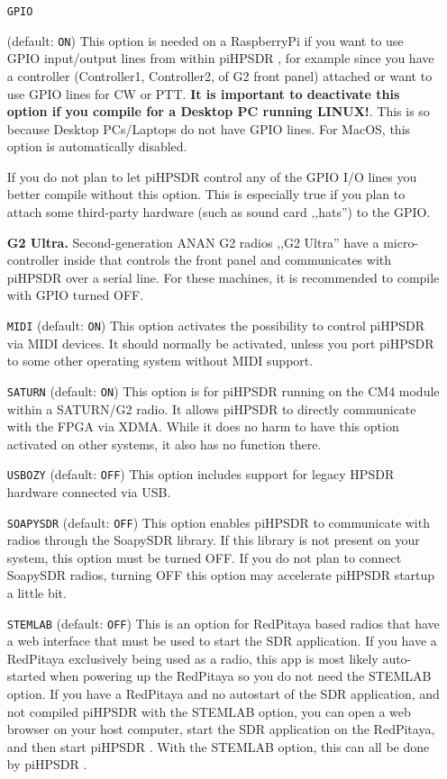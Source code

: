 \documentclass[12pt]{book}
\def\rett#1{\texttt{\color{red}#1}}
\def\pH{pi\-HPSDR }
\begin{document}
\begin{itemize}
\item[\rett{GPIO}] {(default: \texttt{ON})
This option is needed on a RaspberryPi if you want to use GPIO input/output lines from
within \pH, for example since you have a controller (Controller1, Controller2, of G2 front panel)
attached or want to use GPIO lines for CW or PTT. \textbf{It is important to deactivate this option
if you compile for a Desktop PC running LINUX!}. This is so because Desktop PCs/Laptops do not
have GPIO lines. For MacOS, this option is automatically disabled.

If you do not plan to let \pH control any of the GPIO I/O lines you better compile without this option.
This is especially true if you plan to attach some third-party hardware (such as sound card ,,hats'')
to the GPIO.

{\bf G2 Ultra.} Second-generation ANAN G2 radios ,,G2 Ultra'' have a micro-controller inside that
controls the front panel and communicates with \pH over a serial line. For these machines, it is
recommended to compile with GPIO turned OFF.
}

\item[\rett{MIDI}] {(default: \texttt{ON})
This option activates the possibility to control \pH via MIDI devices. It should normally be
activated, unless you port \pH to some other operating system without MIDI support.
}

\item[\rett{SATURN}] {(default: \texttt{ON})
This option is for \pH running on the CM4 module within a SATURN/G2 radio. It allows
\pH to directly communicate with the FPGA via XDMA. While it does no harm to have this option activated
on other systems, it also has no function there.
}

\item[\rett{USBOZY}] {(default: \texttt{OFF})
This option includes support for legacy HPSDR hardware connected via USB.
}

\item[\rett{SOAPYSDR}] {(default: \texttt{OFF})
This option enables \pH to communicate with radios through the SoapySDR library. If this library
is not present on your system, this option must be turned OFF. If you do not plan to connect SoapySDR
radios, turning OFF this option may accelerate \pH startup a little bit.
}

\item[\rett{STEMLAB}] {(default: \texttt{OFF})
This is an option for RedPitaya based radios that have a web interface that must be used
to start the SDR application. If you have a RedPitaya exclusively being used as a radio, this
app is most likely auto-started when powering up the RedPitaya so you do not need the STEMLAB
option.
If you have a RedPitaya and no autostart of the SDR application, and not compiled \pH
with the STEMLAB option, you can open a web browser on your host computer, start the SDR application on the RedPitaya,
and then start \pH. With the STEMLAB option, this can all be done by \pH.
}


\end{itemize}
\end{document}
